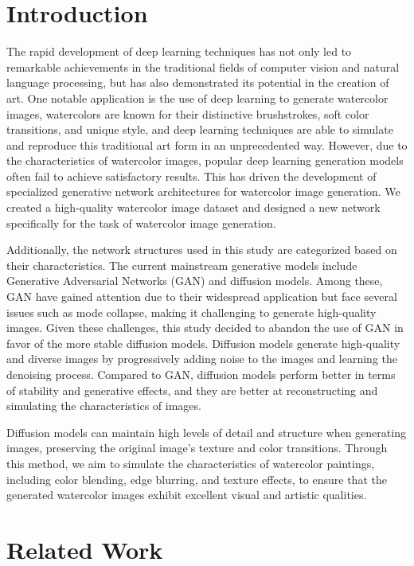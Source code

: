 \documentclass{acsman}
\begin{document}

\section{Introduction}
The rapid development of deep learning techniques has not only led to remarkable achievements in the traditional fields of computer vision and natural language processing, but has also demonstrated its potential in the creation of art. One notable application is the use of deep learning to generate watercolor images, watercolors are known for their distinctive brushstrokes, soft color transitions, and unique style, and deep learning techniques are able to simulate and reproduce this traditional art form in an unprecedented way. However, due to the characteristics of watercolor images, popular deep learning generation models often fail to achieve satisfactory results. This has driven the development of specialized generative network architectures for watercolor image generation. We created a high-quality watercolor image dataset and designed a new network specifically for the task of watercolor image generation.

Additionally, the network structures used in this study are categorized based on their characteristics. The current mainstream generative models include Generative Adversarial Networks (GAN) \cite{goodfellow2020generative} and diffusion models. Among these, GAN have gained attention due to their widespread application but face several issues such as mode collapse, making it challenging to generate high-quality images. Given these challenges, this study decided to abandon the use of GAN in favor of the more stable diffusion models. Diffusion models generate high-quality and diverse images by progressively adding noise to the images and learning the denoising process. Compared to GAN, diffusion models perform better in terms of stability and generative effects, and they are better at reconstructing and simulating the characteristics of images.

Diffusion models can maintain high levels of detail and structure when generating images, preserving the original image's texture and color transitions. Through this method, we aim to simulate the characteristics of watercolor paintings, including color blending, edge blurring, and texture effects, to ensure that the generated watercolor images exhibit excellent visual and artistic qualities.

\section{Related Work}\label{sec:related work}
\end{document}
